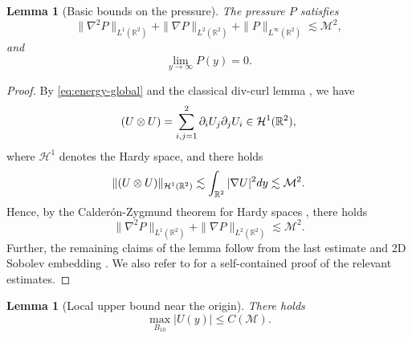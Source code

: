 \documentclass[12pt,reqno]{amsart}
\theoremstyle{plain}
\newtheorem{lemma}[theorem]{Lemma}
\theoremstyle{definition}
\newcommand{\R}{\mathbb{R}}
\newcommand{\M}{\mathcal{M}}
\newcommand{\p}{\partial}
\renewcommand{\:}{\colon}
\let\div\relax
\DeclareMathOperator{\div}{div}
\numberwithin{equation}{section}
\numberwithin{figure}{section}
\begin{document}
\begin{lemma}[Basic bounds on the pressure]
    \label{lem:pressurebounds}
     The pressure $P$ satisfies
     \begin{equation} \label{eq:Pbound}
    \| \nabla^2 P \|_{L^1(\R^2)} + \| \nabla P \|_{L^2(\R^2)} + \| P \|_{L^\infty(\R^2)} \lesssim \M^2,
    \end{equation}
    and
    \begin{equation} \label{eq:P-asymp}
    	\lim_{y \to \infty} P(y) = 0.
    \end{equation}
\end{lemma}
    
\begin{proof}
    By \eqref{eq:energy-global} and the classical div-curl lemma \cite{CoifmanLionsMeyerSemmes}, we have
    \begin{equation}
         \div \div (U\otimes U) = \sum_{i,j =1}^2 \p_i U_j \partial_{j} U_{i} \in \mathcal{H}^1(\R^2),
    \end{equation}
    where $\mathcal{H}^1$ denotes the Hardy space, and there holds
    \begin{equation}
        \|\div   \div   (U\otimes U)\|_{\mathcal{H}^1(\R^2)} \lesssim \int_{\R^2} |\nabla U|^2 dy \lesssim \M^2.
    \end{equation}
    Hence, by the Calder\'on-Zygmund theorem for Hardy spaces \cite{SteinBook}, there holds
     \begin{equation}
     	\| \nabla^2 P \|_{L^1(\R^2)} + \| \nabla P \|_{L^2(\R^2)} \lesssim \M^2.
     \end{equation}
     Further, the remaining claims of the lemma follow from the last estimate and 2D Sobolev embedding \cite{MazyaBook}. We also refer to \cite[Theorem 5.13]{BFbook2002} for a self-contained proof of the relevant estimates.
\end{proof}

\begin{lemma}[Local upper bound near the origin] \label{lem:local}
	There holds
	\begin{equation} \label{eq:local-bound}
		\max_{B_{10}} |U(y)| \le C(\M).
	\end{equation}
\end{lemma}
\end{document}
